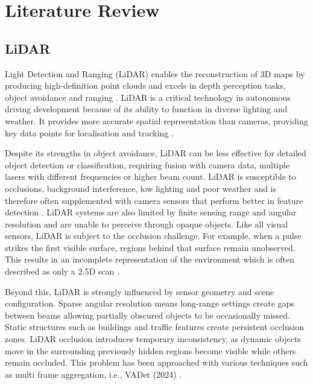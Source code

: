\documentclass[12pt,a4paper]{article}
\begin{document}
\section{Literature Review}

\subsection{LiDAR}

Light Detection and Ranging (LiDAR) enables the reconstruction of 3D
maps by producing high-definition point clouds and excels in depth
perception tasks, object avoidance and ranging
\cite{bib_ref_3}. LiDAR is a critical technology in
autonomous driving development because of its ability to function in
diverse lighting and weather. It provides more accurate spatial
representation than cameras, providing key data points for localisation
and tracking \cite{bib_ref_4}.

Despite its strengths in object avoidance, LiDAR can be less effective for
detailed object detection or classification, requiring fusion with
camera data, multiple lasers with different frequencies or higher beam
count. LiDAR is susceptible to occlusions, background interference, low
lighting and poor weather and is therefore often supplemented with camera sensors
that perform better in feature detection \cite{bib_ref_5}.
LiDAR systems are also limited by finite sensing range and angular
resolution and are unable to perceive through opaque objects. Like all
visual sensors, LiDAR is subject to the occlusion challenge. For
example, when a pulse strikes the first visible surface, regions behind that surface
remain unobserved. This results in an incomplete representation of the
environment which is often described as only a 2.5D scan
\cite{bib_ref_6}.

Beyond this, LiDAR is strongly influenced by sensor geometry and scene
configuration. Sparse angular resolution means long-range settings
create gaps between beams allowing partially obscured objects to be
occasionally missed. Static structures such as buildings and traffic
features create persistent occlusion zones. LiDAR occlusion introduces
temporary inconsistency, as dynamic objects move in the surrounding
previously hidden regions become visible while others remain occluded.
This problem has been approached with various techniques such as multi
frame aggregation, i.e., VADet (2024)
\cite{bib_ref_7,bib_ref_8}.

\subsection{}
\end{document}
